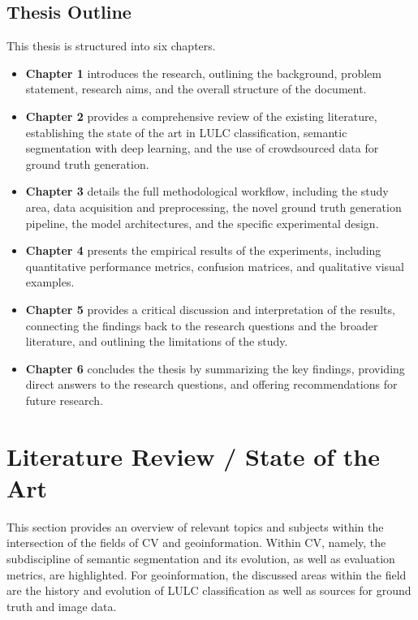 \documentclass{report}
\begin{document}
\subsection{Thesis Outline}
This thesis is structured into six chapters.
\begin{itemize}
\item \textbf{Chapter 1} introduces the research, outlining the background, problem statement, research aims, and the overall structure of the document.
\item \textbf{Chapter 2} provides a comprehensive review of the existing literature, establishing the state of the art in LULC classification, semantic segmentation with deep learning, and the use of crowdsourced data for ground truth generation.
\item \textbf{Chapter 3} details the full methodological workflow, including the study area, data acquisition and preprocessing, the novel ground truth generation pipeline, the model architectures, and the specific experimental design.
\item \textbf{Chapter 4} presents the empirical results of the experiments, including quantitative performance metrics, confusion matrices, and qualitative visual examples.
\item \textbf{Chapter 5} provides a critical discussion and interpretation of the results, connecting the findings back to the research questions and the broader literature, and outlining the limitations of the study.
\item \textbf{Chapter 6} concludes the thesis by summarizing the key findings, providing direct answers to the research questions, and offering recommendations for future research.
\end{itemize}
\clearpage %
\section{Literature Review / State of the Art}
This section provides an overview of relevant topics and subjects within the intersection of the fields of CV and geoinformation. Within CV, namely, the subdiscipline of semantic segmentation and its evolution, as well as evaluation metrics, are highlighted. For geoinformation, the discussed areas within the field are the history and evolution of LULC classification as well as sources for ground truth and image data.
\end{document}
